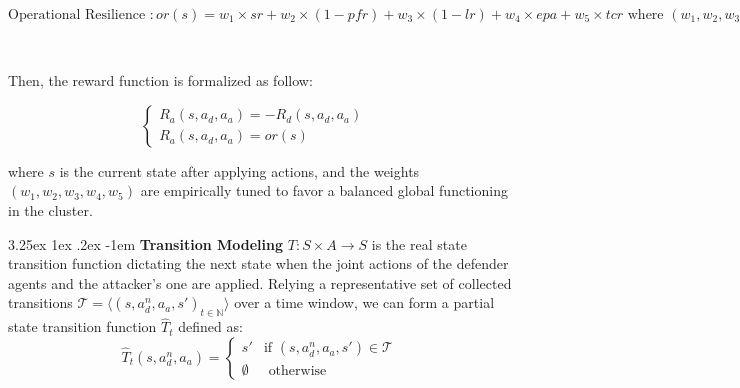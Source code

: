 \documentclass[conference]{IEEEtran}
\makeatletter
\renewcommand\paragraph{\@startsection{paragraph}{5}{\z@}%
  {3.25ex \@plus1ex \@minus.2ex}%
  {-1em}%
  {\normalfont\normalsize\bfseries}}
\makeatother
\begin{document}
\vspace{0.3cm}

$\text{Operational Resilience }: or(s) = w_1 \times sr
\allowbreak + w_2 \times (1 - pfr)
\allowbreak + w_3 \times (1 - lr)
\allowbreak + w_4 \times epa
\allowbreak + w_5 \times tcr
\text{ where } (w_1, w_2, w_3, w_4, w_5) \text{ are relative weights.}$

\

Then, the reward function is formalized as follow:

$$
\begin{cases} 
    R_a(s, a_d, a_a) = -R_d(s, a_d, a_a) & \\
    R_a(s, a_d, a_a) = or(s)
\end{cases}
$$

where $s$ is the current state after applying actions, and the weights $(w_1, w_2, w_3, w_4, w_5)$ are empirically tuned to favor a balanced global functioning in the cluster.


\noindent \paragraph{\textbf{Transition Modeling}} $T: S \times A \rightarrow S$ is the real state transition function dictating the next state when the joint actions of the defender agents and the attacker's one are applied. Relying a representative set of collected transitions $\mathcal{T} = \langle(s, a_d^n, a_a, s')_{t\in \mathbb{N}}\rangle$ over a time window, we can form a partial state transition function $\hat{T}_t$ defined as:
%
$$
\hat{T}_t(s, a_d^n, a_a) =
\begin{cases} 
    s' & \text{if } (s, a_d^n, a_a, s') \in \mathcal{T} \\
    \emptyset & \text{ otherwise}
\end{cases}
$$
\end{document}
